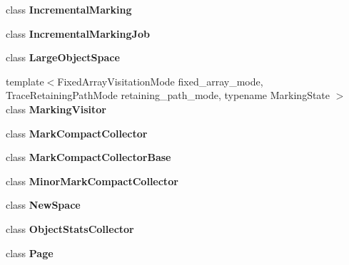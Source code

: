\begin{DoxyCompactItemize}
class {\bfseries Incremental\+Marking}
\item 
\mbox{\label{classv8_1_1internal_1_1Heap_a0c015853f0a98ba05564e7c1c47c466a}} 
class {\bfseries Incremental\+Marking\+Job}
\item 
\mbox{\label{classv8_1_1internal_1_1Heap_ae7bd71eb9e957e0b89a7d3a76836d4b3}} 
class {\bfseries Large\+Object\+Space}
\item 
\mbox{\label{classv8_1_1internal_1_1Heap_adced706b7d31c9c7a34c75ed7b234542}} 
{\footnotesize template$<$Fixed\+Array\+Visitation\+Mode fixed\+\_\+array\+\_\+mode, Trace\+Retaining\+Path\+Mode retaining\+\_\+path\+\_\+mode, typename Marking\+State $>$ }\\class {\bfseries Marking\+Visitor}
\item 
\mbox{\label{classv8_1_1internal_1_1Heap_ae585a96455613b2bc2ae3ea75a061d8b}} 
class {\bfseries Mark\+Compact\+Collector}
\item 
\mbox{\label{classv8_1_1internal_1_1Heap_aa76925bb5fe31ad1b88dce091ca1c1df}} 
class {\bfseries Mark\+Compact\+Collector\+Base}
\item 
\mbox{\label{classv8_1_1internal_1_1Heap_a5715de0d7b58c9aef792f71b39874ded}} 
class {\bfseries Minor\+Mark\+Compact\+Collector}
\item 
\mbox{\label{classv8_1_1internal_1_1Heap_a71065109e762b07b59b80cd64d885ff8}} 
class {\bfseries New\+Space}
\item 
\mbox{\label{classv8_1_1internal_1_1Heap_a9ddfbaf1cc807e1830d16802ab030850}} 
class {\bfseries Object\+Stats\+Collector}
\item 
\mbox{\label{classv8_1_1internal_1_1Heap_a66d145c56e1747e0aecb5309042ab183}} 
class {\bfseries Page}
\item 
\mbox{\label{classv8_1_1internal_1_1Heap_a57d18a423c610563132a99ab1e1c1b8e}} 

\end{DoxyCompactItemize}

